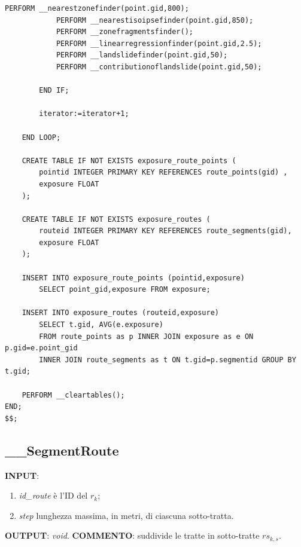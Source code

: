 \begin{lstlisting}[style = mystyle]
			PERFORM __nearestzonefinder(point.gid,800);
			PERFORM __nearestisoipsefinder(point.gid,850);
			PERFORM __zonefragmentsfinder();
			PERFORM __linearregressionfinder(point.gid,2.5);
			PERFORM __landslidefinder(point.gid,50);
			PERFORM __contributionoflandslide(point.gid,50);

		END IF;

		iterator:=iterator+1;

	END LOOP;

	CREATE TABLE IF NOT EXISTS exposure_route_points (
		pointid INTEGER PRIMARY KEY REFERENCES route_points(gid) ,
		exposure FLOAT
	);
	
	CREATE TABLE IF NOT EXISTS exposure_routes (
		routeid INTEGER PRIMARY KEY REFERENCES route_segments(gid),
		exposure FLOAT
	);

	INSERT INTO exposure_route_points (pointid,exposure) 
		SELECT point_gid,exposure FROM exposure;
	
	INSERT INTO exposure_routes (routeid,exposure) 
		SELECT t.gid, AVG(e.exposure) 
		FROM route_points as p INNER JOIN exposure as e ON p.gid=e.point_gid
		INNER JOIN route_segments as t ON t.gid=p.segmentid GROUP BY t.gid;

	PERFORM __cleartables();
END;
$$;

\end{lstlisting}

\subsection{\_\_SegmentRoute}

\textbf{INPUT}: 
\begin{enumerate}
	\item \textit{id\_route} è l'ID del $r_k$;
	\item \textit{step} lunghezza massima, in metri, di ciascuna sotto-tratta. 
\end{enumerate}
\textbf{OUTPUT}: \textit{void}. \newline
\textbf{COMMENTO}: suddivide le tratte in sotto-tratte $rs_{k,s}$.

